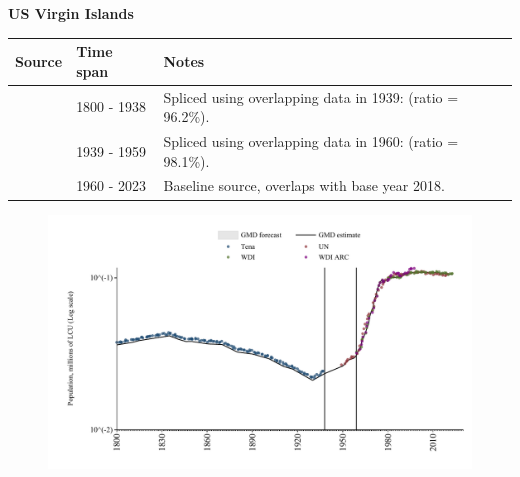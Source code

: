 \documentclass[12pt,a4paper,landscape]{article}
\begin{document}
\begin{adjustbox}{max totalsize={\paperwidth}{\paperheight},center}
\begin{minipage}[t][\textheight][t]{\textwidth}
\vspace*{0.5cm}
{}
\begin{center}
{\Large\bfseries US Virgin Islands}
\end{center}
\vspace{0.5cm}
\begin{table}[H]
\centering
\small
\begin{tabular}{|l|l|l|}
\hline
\textbf{Source} & \textbf{Time span} & \textbf{Notes} \\
\hline
\rowcolor{white}\cite{Tena}& 1800 - 1938 &Spliced using overlapping data in 1939: (ratio = 96.2\%).\\
\rowcolor{lightgray}\cite{UN}& 1939 - 1959 &Spliced using overlapping data in 1960: (ratio = 98.1\%).\\
\rowcolor{white}\cite{WDI}& 1960 - 2023 &Baseline source, overlaps with base year 2018.\\
\hline
\end{tabular}
\end{table}
\begin{figure}[H]
\centering
\includegraphics[width=\textwidth,height=0.6\textheight,keepaspectratio]{graphs/VIR_pop.pdf}
\end{figure}
\end{minipage}
\end{adjustbox}
\end{document}

